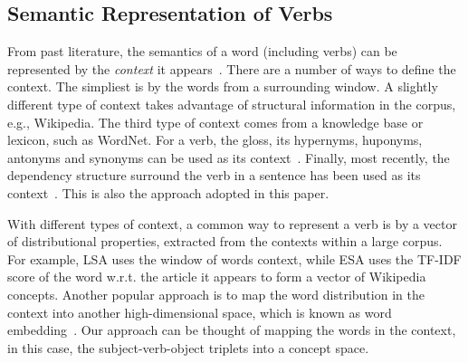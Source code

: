 \subsection{Semantic Representation of Verbs}
From past literature, the semantics of a word (including verbs) can be
represented by the {\em context} it appears~\cite{}. 
There are a number of ways to define the context. The simpliest is by the 
words from a surrounding window. 
A slightly different type of context takes advantage of structural information
in the corpus, e.g., Wikipedia. The third type of context comes from 
a knowledge base or lexicon,
such as WordNet. For a verb, the gloss, its hypernyms, huponyms, antonyms and
synonyms can be used as its context~\cite{}. 
Finally, most recently, the dependency structure surround the verb in a 
sentence has been used as its context~\cite{}. This is also the approach
adopted in this paper. 

With different types of context, a common way to represent a verb is by
a vector of distributional properties, extracted from the contexts within
a large corpus. For example, LSA \cite{DeerwesterDLFH90} 
uses the window of words context, 
while ESA \cite{GabrilovichM07:ESA} uses the TF-IDF score of the word w.r.t.
the article it appears to form a vector of Wikipedia concepts.
Another popular approach is to map the word distribution in the context
into another high-dimensional space, which is known as word embedding~\cite{}.
Our approach can be thought of mapping the words in the context, in this
case, the subject-verb-object triplets into a concept space.
 


